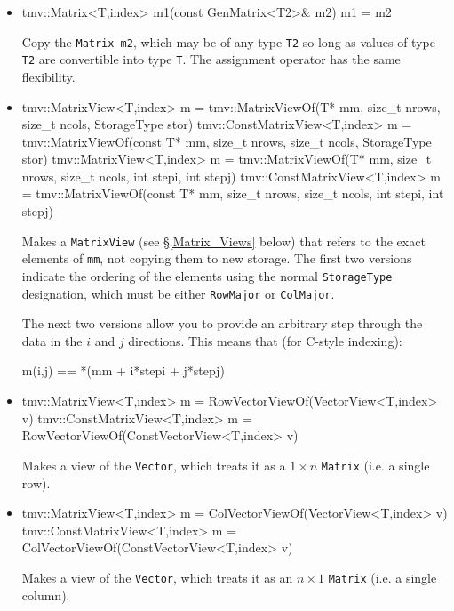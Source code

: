 \documentclass[twoside,letterpaper,11pt]{article}
\renewcommand{\tt}[1]{{\lstinline {#1}}}
\begin{document}
\begin{itemize}
\item
\begin{tmvcode}
tmv::Matrix<T,index> m1(const GenMatrix<T2>& m2)
m1 = m2
\end{tmvcode}
Copy the \tt{Matrix m2}, which may be of any type \tt{T2} so long
as values of type \tt{T2} are convertible into type \tt{T}.
The assignment operator has the same flexibility.

\item
\begin{tmvcode}
tmv::MatrixView<T,index> m = 
      tmv::MatrixViewOf(T* mm, size_t nrows, size_t ncols, 
      StorageType stor)
tmv::ConstMatrixView<T,index> m = 
      tmv::MatrixViewOf(const T* mm,  size_t nrows, size_t ncols, 
      StorageType stor)
tmv::MatrixView<T,index> m = 
      tmv::MatrixViewOf(T* mm, size_t nrows, size_t ncols, 
      int stepi, int stepj)
tmv::ConstMatrixView<T,index> m = 
      tmv::MatrixViewOf(const T* mm,  size_t nrows, size_t ncols, 
      int stepi, int stepj)
\end{tmvcode}
Makes a \tt{MatrixView} (see \S\ref{Matrix_Views} below) that refers to the exact
elements of \tt{mm}, not copying them to new storage.  The first two versions
indicate the ordering of the elements using the normal \tt{StorageType}
designation, which must be either \tt{RowMajor} or \tt{ColMajor}.
  
The next two versions allow you to provide an arbitrary step through
the data in the $i$ and $j$ directions.  This means that (for C-style indexing):
\begin{tmvcode}
m(i,j) == *(mm + i*stepi + j*stepj)
\end{tmvcode}

\item
\begin{tmvcode}
tmv::MatrixView<T,index> m = 
      RowVectorViewOf(VectorView<T,index> v)
tmv::ConstMatrixView<T,index> m = 
      RowVectorViewOf(ConstVectorView<T,index> v)
\end{tmvcode}
Makes a view of the \tt{Vector}, which treats it as a $1\times n$ \tt{Matrix}
(i.e. a single row).  

\item
\begin{tmvcode}
tmv::MatrixView<T,index> m = 
      ColVectorViewOf(VectorView<T,index> v)
tmv::ConstMatrixView<T,index> m = 
      ColVectorViewOf(ConstVectorView<T,index> v)
\end{tmvcode}
Makes a view of the \tt{Vector}, which treats it as an $n \times 1$ \tt{Matrix}
(i.e. a single column).  

\end{itemize}
\end{document}
